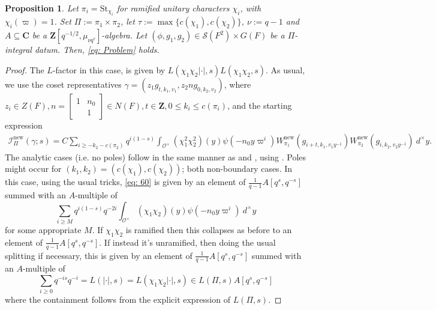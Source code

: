 \documentclass{amsart}
\theoremstyle{plain}
\newtheorem{prop}[thm]{Proposition}
\theoremstyle{plain}
\theoremstyle{remark}
\begin{document}
\begin{prop}
 Let $\pi_i=\mathrm{St}_{\chi_i}$ for ramified unitary characters $\chi_i$, with $\chi_i(\varpi)=1$. Set $\Pi:=\pi_1\times\pi_2$, let $\tau:=\max\{c(\chi_1),c(\chi_2)\}$, $\nu:=q-1$ and $A\subseteq\mathbf{C}$ be a $\mathbf{Z}[q^{-1/2},\mu_{\nu q^{\tau}}]$-algebra. Let $(\phi,g_1,g_2)\in\mathcal{S}(F^2)\times G(F)$ be a $\Pi$-integral datum. Then, \eqref{eq: Problem} holds.
\end{prop}

\begin{proof}
    The $L$-factor in this case, is given by $L(\chi_1\chi_2|\cdot|,s)L(\chi_1\chi_2,s)$. As usual, we use the coset representatives $\gamma=(z_1g_{t,k_1,v_1},z_2ng_{0,k_2,v_2})$, where $z_i\in Z(F),n=\left[\begin{smallmatrix}
            1 & n_0\\
            & 1
        \end{smallmatrix}\right]\in N(F),t\in\mathbf{Z}, 0\leq k_i\leq c(\pi_i)$, and the starting expression
        \begin{align}\label{eq: 60}
            {\mathcal{I}_{\Pi}^\mathrm{new}(\gamma;s)=C\sum_{i\geq -k_2-c(\pi_2)}q^{i(1-s)}\int_{\mathcal{O}^\times}(\chi_1^2\chi_2^2)(y)\psi(-n_0y\varpi^i)W_{\pi_1}^\mathrm{new}(g_{i+t,k_1,v_1y^{-1}})W_{\pi_2}^\mathrm{new}(g_{i,k_2,v_2y^{-1}})\ d^\times y}.
        \end{align}
        The analytic cases (i.e. no poles) follow in the same manner as  and , using \cite[Lemma $3.3$]{Assing_2018}. Poles might occur for $(k_1,k_2)=(c(\chi_1),c(\chi_2))$; both non-boundary cases. In this case, using the usual tricks, \eqref{eq: 60} is given by an element of $\tfrac{1}{q-1}A[q^s,q^{-s}]$ summed with an $A$-multiple of 
        $$\sum_{i\geq M}q^{i(1-s)}q^{-2i}\int_{\mathcal{O}^\times}(\chi_1\chi_2)(y)\psi(-n_0y\varpi^i)\ d^\times y$$
        for some appropriate $M$. If $\chi_1\chi_2$ is ramified then this collapses as before to an element of $\tfrac{1}{q-1}A[q^s,q^{-s}]$. If instead it's unramified, then doing the usual splitting if necessary, this is given by an element of $\tfrac{1}{q-1}A[q^s,q^{-s}]$ summed with an $A$-multiple of
        $$\sum_{i\geq 0}q^{-is}q^{-i}=L(|\cdot|,s)=L(\chi_1\chi_2|\cdot|,s)\in L(\Pi,s)A[q^s,q^{-s}]$$
        where the containment follows from the explicit expression of $L(\Pi,s)$.
\end{proof}
\end{document}
